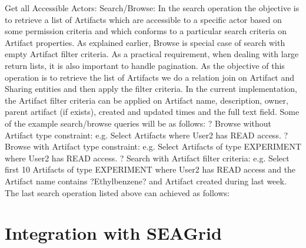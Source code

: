 \documentclass[sigconf]{acmart}
\begin{document}
Get all Accessible Actors:
Search/Browse: In the search operation the objective is to retrieve a list of Artifacts which are accessible to a specific actor based on some permission criteria and  which conforms to a particular search criteria on Artifact properties. As explained earlier, Browse is special case of search with empty Artifact filter criteria. As a practical requirement, when dealing with large return lists, it is also important to handle pagination. As the objective of this operation is to retrieve the list of Artifacts we do a relation join on Artifact and Sharing entities and then apply the filter criteria. In the current implementation, the Artifact filter criteria can be applied on Artifact name, description, owner, parent artifact (if exists), created and updated times and the full text field. Some of the example search/browse queries will be as follows:
?	Browse without Artifact type constraint: e.g. Select Artifacts where User2 has READ access.
?	Browse with Artifact type constraint: e.g. Select Artifacts of type EXPERIMENT where User2 has READ access.
?	Search with Artifact filter criteria: e.g. Select first 10 Artifacts of type EXPERIMENT where User2 has READ access and the Artifact name contains ?Ethylbenzene? and Artifact created during last week.
The last search operation listed above can achieved as follows:



\section{Integration with SEAGrid}
\end{document}
